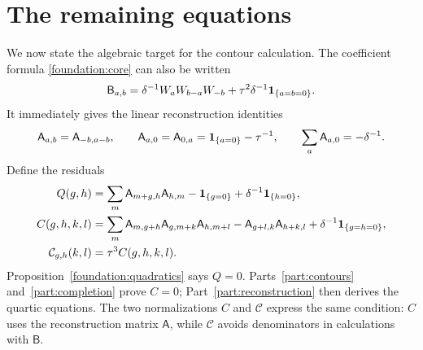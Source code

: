 \section{The remaining equations}
\label{sec:targets}

We now state the algebraic target for the contour calculation.
The coefficient formula \eqref{foundation:core} can also be written
\begin{equation}\label{tail:uniform-core}
 \mathsf B_{a,b}=\delta^{-1}W_aW_{b-a}W_{-b}
                  +\tau^2\delta^{-1}\mathbf1_{\{a=b=0\}}.
\end{equation}
It immediately gives the linear reconstruction identities
\begin{equation}\label{tail:linear}
 \mathsf A_{a,b}=\mathsf A_{-b,a-b},\qquad
 \mathsf A_{a,0}=\mathsf A_{0,a}=\mathbf1_{\{a=0\}}-\tau^{-1},
 \qquad \sum_a\mathsf A_{a,0}=-\delta^{-1}.
\end{equation}
Define the residuals
\begin{align}
 Q(g,h)&=\sum_m\mathsf A_{m+g,h}\mathsf A_{h,m}
                  -\mathbf1_{\{g=0\}}+\delta^{-1}\mathbf1_{\{h=0\}},\label{tail:Q}\\
 C(g,h,k,l)&=\sum_m\mathsf A_{m,g+h}\mathsf A_{g,m+k}
                         \mathsf A_{h,m+l}
       -\mathsf A_{g+l,k}\mathsf A_{h+k,l}
       +\delta^{-1}\mathbf1_{\{g=h=0\}},\label{tail:C}\\
 \mathcal C_{g,h}(k,l)&=\tau^3C(g,h,k,l).\label{tail:scaledC}
\end{align}
Proposition~\ref{foundation:quadratics} says $Q=0$.
Parts~\ref{part:contours} and~\ref{part:completion} prove $C=0$;
Part~\ref{part:reconstruction} then derives the quartic equations.
The two normalizations $C$ and $\mathcal C$ express the same condition:
$C$ uses the reconstruction matrix $\mathsf A$, while $\mathcal C$
avoids denominators in calculations with $\mathsf B$.
